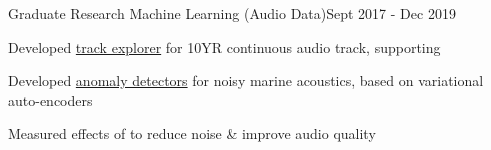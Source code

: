 \documentclass{article}
\newenvironment{**mylist}[2]{

\subsubsection*{#1\hfill#2}
  \small
  \begin{list}{}{}
    \setlength{\topsep}{0pt}
   \setlength{\itemsep}{1pt}
   \setlength{\parskip}{0pt}
   \setlength{\parsep}{0pt}}{\end{list}\normalsize}
\newcommand{\LU}[1]{\hspace{-1em}{\bf Technologies : #1}}
\def\grd{Graduate\xspace}
\begin{document}
\begin{**mylist}{\grd Research \tabb Machine Learning (Audio Data)}{Sept 2017 - Dec 2019}
\item Developed \href{https://github.com/probinso/ACOio}{track explorer} for 10YR continuous audio track, supporting  %
\item Developed \href{https://github.com/probinso/gumiho-network}{anomaly detectors} for noisy marine acoustics, based on variational auto-encoders
\item Measured effects of  to reduce noise \& improve audio quality
\end{**mylist}
\end{document}
